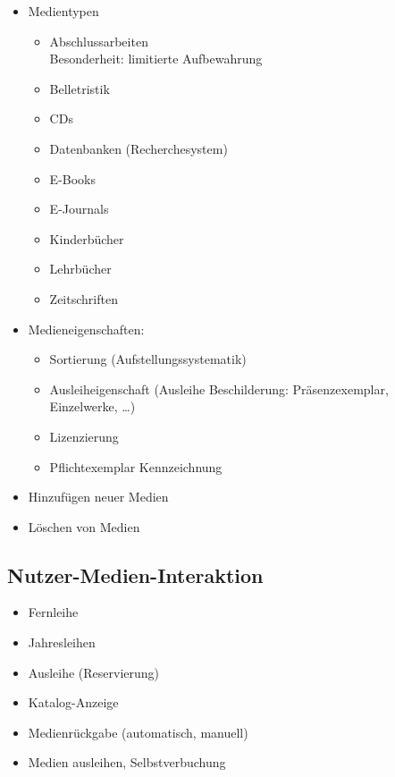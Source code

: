 \begin{itemize}
\item Medientypen
\begin{itemize}
\item Abschlussarbeiten\\
Besonderheit: limitierte Aufbewahrung
\item Belletristik
\item CDs
\item Datenbanken (Recherchesystem)
\item E-Books
\item E-Journals
\item Kinderbücher
\item Lehrbücher
\item Zeitschriften
\end{itemize}
\item Medieneigenschaften:
\begin{itemize}
\item Sortierung (Aufstellungssystematik)
\item Ausleiheigenschaft (Ausleihe Beschilderung: Präsenzexemplar, Einzelwerke, …)
\item Lizenzierung
\item Pflichtexemplar Kennzeichnung
\end{itemize}
\item Hinzufügen neuer Medien
\item Löschen von Medien
\end{itemize}

\subsection{Nutzer-Medien-Interaktion}
\begin{itemize}
\item Fernleihe
\item Jahresleihen
\item Ausleihe (Reservierung)
\item Katalog-Anzeige
\item Medienrückgabe (automatisch, manuell)
\item Medien ausleihen, Selbstverbuchung
\end{itemize}

